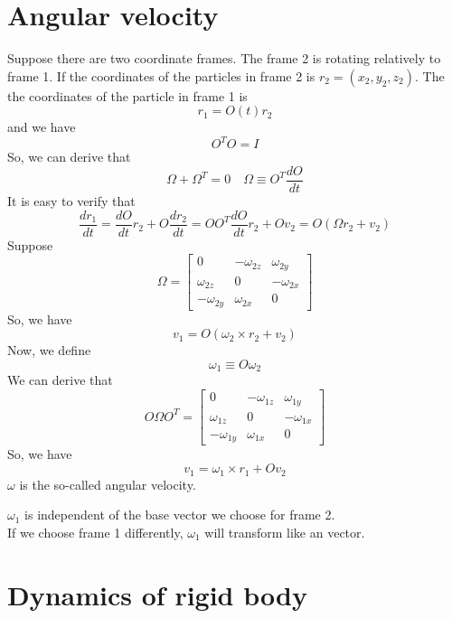 \section{Angular velocity}
Suppose there are two coordinate frames. The frame 2 is rotating relatively to frame 1. If the coordinates of the particles in frame 2 is $r_2=(x_2,y_2,z_2)$.
The the coordinates of the particle in frame 1 is
\[r_1 = O(t)r_2\]
and we have
\[O^TO=I\]
So, we can derive that
\[\Omega + \Omega^T= 0 \quad \Omega \equiv O^T\frac{dO}{dt}\]
It is easy to verify that
\[\frac{dr_1}{dt} = \frac{dO}{dt}r_2 + O\frac{dr_2}{dt} = OO^T \frac{dO}{dt}r_2 + Ov_2  = O (\Omega r_2 + v_2)\]
Suppose
\[\Omega = \left[ \begin{matrix} 0& -\omega_{2z}& \omega_{2y}\\ \omega_{2z}& 0& -\omega_{2x}\\ -\omega_{2y}& \omega_{2x}& 0\end{matrix} \right] \]
So, we have
\[v_1 = O(\omega_2 \times r_2 + v_2) \]
Now, we define
\[\omega_1 \equiv O\omega_2\]
We can derive that
\[O \Omega O^T = \left[ \begin{matrix} 0& -\omega_{1z}& \omega_{1y}\\ \omega_{1z}& 0& -\omega_{1x}\\ -\omega_{1y}& \omega_{1x}& 0\end{matrix} \right] \]
So, we have
\[v_1 = \omega_1 \times r_1 + Ov_2\]
$\omega$ is the so-called angular velocity.
\begin{note}
$\omega_1$ is independent of the base vector we choose for frame 2.\\
If we choose frame 1 differently, $\omega_1$ will transform like an vector.
\end{note}

\section{Dynamics of rigid body}

